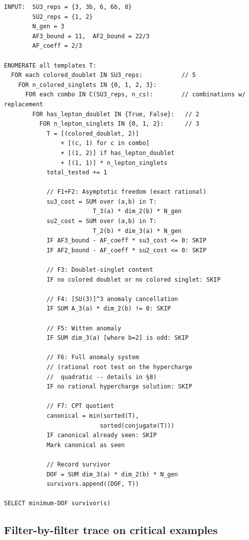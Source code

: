 \documentclass[11pt]{article}
\theoremstyle{definition}
\begin{document}
\begin{small}
\begin{verbatim}
INPUT:  SU3_reps = {3, 3b, 6, 6b, 8}
        SU2_reps = {1, 2}
        N_gen = 3
        AF3_bound = 11,  AF2_bound = 22/3
        AF_coeff = 2/3

ENUMERATE all templates T:
  FOR each colored_doublet IN SU3_reps:           // 5
    FOR n_colored_singlets IN {0, 1, 2, 3}:
      FOR each combo IN C(SU3_reps, n_cs):        // combinations w/ replacement
        FOR has_lepton_doublet IN {True, False}:   // 2
          FOR n_lepton_singlets IN {0, 1, 2}:      // 3
            T = [(colored_doublet, 2)]
                + [(c, 1) for c in combo]
                + [(1, 2)] if has_lepton_doublet
                + [(1, 1)] * n_lepton_singlets
            total_tested += 1

            // F1+F2: Asymptotic freedom (exact rational)
            su3_cost = SUM over (a,b) in T:
                         T_3(a) * dim_2(b) * N_gen
            su2_cost = SUM over (a,b) in T:
                         T_2(b) * dim_3(a) * N_gen
            IF AF3_bound - AF_coeff * su3_cost <= 0: SKIP
            IF AF2_bound - AF_coeff * su2_cost <= 0: SKIP

            // F3: Doublet-singlet content
            IF no colored doublet or no colored singlet: SKIP

            // F4: [SU(3)]^3 anomaly cancellation
            IF SUM A_3(a) * dim_2(b) != 0: SKIP

            // F5: Witten anomaly
            IF SUM dim_3(a) [where b=2] is odd: SKIP

            // F6: Full anomaly system
            // (rational root test on the hypercharge
            //  quadratic -- details in §8)
            IF no rational hypercharge solution: SKIP

            // F7: CPT quotient
            canonical = min(sorted(T),
                           sorted(conjugate(T)))
            IF canonical already seen: SKIP
            Mark canonical as seen

            // Record survivor
            DOF = SUM dim_3(a) * dim_2(b) * N_gen
            survivors.append((DOF, T))

SELECT minimum-DOF survivor(s)
\end{verbatim}
\end{small}


\subsection{Filter-by-filter trace on critical examples}
\label{app:filter_trace}
\end{document}
